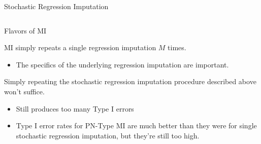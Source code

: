 \documentclass{beamer}\usepackage[]{graphicx}\usepackage[]{color}
\newenvironment{knitrout}{}{} %
\begin{document}
\begin{frame}[fragile]{Stochastic Regression Imputation}
\begin{columns}
\begin{column}{0.5\textwidth}
\begin{knitrout}
{}



\end{knitrout}
  
\end{column}
\end{columns}

\end{frame}

\watermarkon %

\begin{frame}{Flavors of MI}
  
  MI simply repeats a single regression imputation $M$ times.
  \begin{itemize}
  \item The specifics of the underlying regression imputation are important.
  \end{itemize}
  \vb
  \pause
  Simply repeating the stochastic regression imputation procedure described 
  above won't suffice.
  \begin{itemize}
  \item Still produces too many Type I errors
  \end {itemize}
  
\begin{table}[ht]
\centering
{}
\caption{Mean Correlation Coefficients and Type I Error Rates} 
\end{table}


\begin{itemize}
\item Type I error rates for PN-Type MI are much better than they were for 
  single stochastic regression imputation, but they're still too high.
\end{itemize}

\end{frame}

\end{document}
